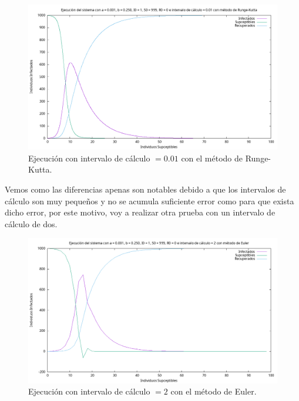 \documentclass[12pt, spanish]{article}
\begin{document}
\begin{figure}[H]
	\centering
			\includegraphics[width=\textwidth]{SIR_001_runge.png}
			\caption{Ejecución con intervalo de cálculo $= 0.01$ con el método de Runge-Kutta.}
\end{figure}

Vemos como las diferencias apenas son notables debido a que los intervalos de cálculo son muy pequeños y no se acumula suficiente error como para que exista dicho error, por este motivo, voy a realizar otra prueba con un intervalo de cálculo de dos.

\begin{figure}[H]
	\centering
			\includegraphics[width=\textwidth]{SIR_2_euler.png}
			\caption{Ejecución con intervalo de cálculo $= 2$ con el método de Euler.}
\end{figure}
\end{document}
